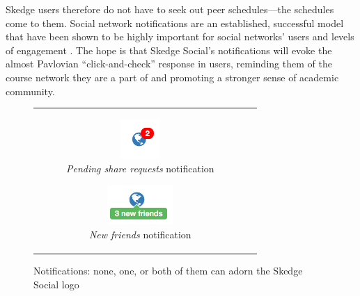   Skedge users therefore do not have to seek out peer schedules---the schedules come to them. Social network notifications are an established, successful model that have been shown to be highly important for social networks' users and levels of engagement \cite{notifications}. The hope is that Skedge Social's notifications will evoke the almost Pavlovian ``click-and-check'' response in users, reminding them of the course network they are a part of and promoting a stronger sense of academic community.

  \begin{figure}[H]
    \centering
    \begin{tabular}{c c}
      \begin{subfigure}[w]{5.5cm}
        \centering
        \includegraphics[height=1.5cm]{images/skedge/social-note1}
        \caption{\emph{Pending share requests} notification} \label{fig:sk-social-note1}
      \end{subfigure}

      \hspace{20pt}
      
      \begin{subfigure}[w]{6.5cm}
        \centering
        \includegraphics[height=1.5cm]{images/skedge/social-note2}
        \caption{\emph{New friends} notification} \label{fig:sk-social-note2}
      \end{subfigure}
    \end{tabular}
    \caption{Notifications: none, one, or both of them can adorn the Skedge Social logo}
  \end{figure}

